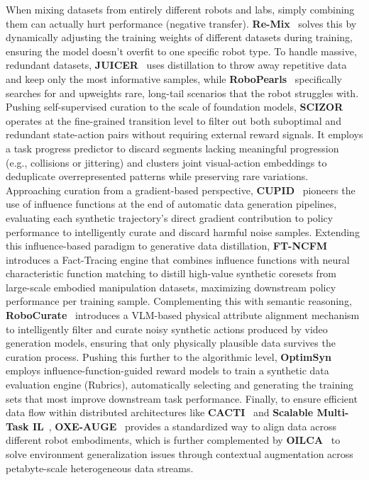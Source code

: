 \documentclass[acmsmall,screen,review,anonymous]{acmart}
\begin{document}
When mixing datasets from entirely different robots and labs, simply combining them can actually hurt performance (negative transfer). \textbf{Re-Mix}~\cite{jason2024remix} solves this by dynamically adjusting the training weights of different datasets during training, ensuring the model doesn't overfit to one specific robot type. To handle massive, redundant datasets, \textbf{JUICER}~\cite{haldar2024juicer} uses distillation to throw away repetitive data and keep only the most informative samples, while \textbf{RoboPearls}~\cite{li2024robopearls} specifically searches for and upweights rare, long-tail scenarios that the robot struggles with. Pushing self-supervised curation to the scale of foundation models, \textbf{SCIZOR}~\cite{zhang2026scizor} operates at the fine-grained transition level to filter out both suboptimal and redundant state-action pairs without requiring external reward signals. It employs a task progress predictor to discard segments lacking meaningful progression (e.g., collisions or jittering) and clusters joint visual-action embeddings to deduplicate overrepresented patterns while preserving rare variations. Approaching curation from a gradient-based perspective, \textbf{CUPID}~\cite{agia2025cupidcuratingdatarobot} pioneers the use of influence functions at the end of automatic data generation pipelines, evaluating each synthetic trajectory's direct gradient contribution to policy performance to intelligently curate and discard harmful noise samples. Extending this influence-based paradigm to generative data distillation, \textbf{FT-NCFM}~\cite{wang2025NCFM} introduces a Fact-Tracing engine that combines influence functions with neural characteristic function matching to distill high-value synthetic coresets from large-scale embodied manipulation datasets, maximizing downstream policy performance per training sample. Complementing this with semantic reasoning, \textbf{RoboCurate}~\cite{kim2026robocurate} introduces a VLM-based physical attribute alignment mechanism to intelligently filter and curate noisy synthetic actions produced by video generation models, ensuring that only physically plausible data survives the curation process. Pushing this further to the algorithmic level, \textbf{OptimSyn}~\cite{fan2026optimsyn} employs influence-function-guided reward models to train a synthetic data evaluation engine (Rubrics), automatically selecting and generating the training sets that most improve downstream task performance. Finally, to ensure efficient data flow within distributed architectures like \textbf{CACTI}~\cite{cacti2024} and \textbf{Scalable Multi-Task IL}~\cite{mtil2024}, \textbf{OXE-AUGE}~\cite{oxe2024auge} provides a standardized way to align data across different robot embodiments, which is further complemented by \textbf{OILCA}~\cite{oilca2024} to solve environment generalization issues through contextual augmentation across petabyte-scale heterogeneous data streams.
\end{document}
